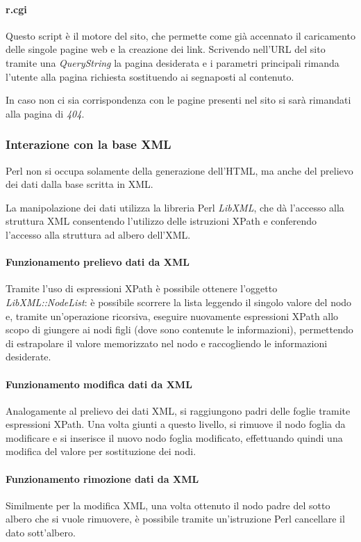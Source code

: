 \paragraph*{r.cgi}Questo script \`e il motore del sito, che permette come gi\`a accennato il caricamento delle singole pagine web e la creazione dei link. Scrivendo nell'URL del sito tramite una \textit{QueryString} la pagina desiderata e i parametri principali rimanda l'utente alla pagina richiesta sostituendo ai segnaposti al contenuto.

In caso non ci sia corrispondenza con le pagine presenti nel sito si sar\`a rimandati alla pagina di \textit{404}.

\subsubsection{Interazione con la base XML}
Perl non si occupa solamente della generazione dell'HTML, ma anche del prelievo dei dati dalla base scritta in XML.

La manipolazione dei dati utilizza la libreria Perl \textit{LibXML}, che d\`a l'accesso alla struttura XML consentendo l'utilizzo delle istruzioni XPath e conferendo l'accesso alla struttura ad albero dell'XML.

\paragraph*{Funzionamento prelievo dati da XML}Tramite l'uso di espressioni XPath \`e possibile ottenere l'oggetto \textit{LibXML::NodeList}: \`e possibile scorrere la lista leggendo il singolo valore del nodo e, tramite un'operazione ricorsiva, eseguire nuovamente espressioni XPath allo scopo di giungere ai nodi figli (dove sono contenute le informazioni), permettendo di estrapolare il valore memorizzato nel nodo e raccogliendo le informazioni desiderate.

\paragraph*{Funzionamento modifica dati da XML}Analogamente al prelievo dei dati XML, si raggiungono padri delle foglie tramite espressioni XPath. Una volta giunti a questo livello, si rimuove il nodo foglia da modificare e si inserisce il nuovo nodo foglia modificato, effettuando quindi una modifica del valore per sostituzione dei nodi.

\paragraph*{Funzionamento rimozione dati da XML}Similmente per la modifica XML, una volta ottenuto il nodo padre del sotto albero che si vuole rimuovere, \`e possibile tramite un'istruzione Perl cancellare il dato sott'albero.

